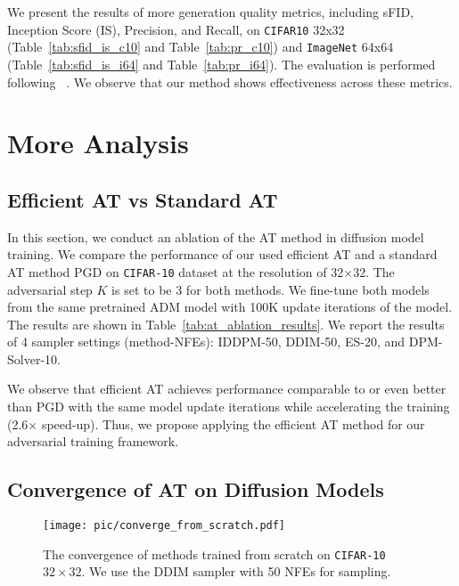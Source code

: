We present the results of more generation quality metrics, including sFID, Inception Score (IS), Precision, and Recall, on \texttt{CIFAR10} 32x32 (Table~\ref{tab:sfid_is_c10} and Table~\ref{tab:pr_c10}) and \texttt{ImageNet} 64x64 (Table~\ref{tab:sfid_is_i64} and Table~\ref{tab:pr_i64}). 
The evaluation is performed following ~\cite{dhariwal2021diffusion}. 
We observe that our method shows effectiveness across these metrics.



\section{More Analysis}
\subsection{Efficient AT vs Standard AT}\label{app:at_ablation}


In this section, we conduct an ablation of the AT method in diffusion model training.
We compare the performance of our used efficient AT and a standard AT method PGD on \texttt{CIFAR-10} dataset at the resolution of 32$\times$32.
The adversarial step $K$ is set to be 3 for both methods.
We fine-tune both models from the same pretrained ADM model with 100K update iterations of the model. 
The results are shown in Table~\ref{tab:at_ablation_results}.
We report the results of 4 sampler settings (method-NFEs): IDDPM-50, DDIM-50, ES-20, and DPM-Solver-10.


We observe that efficient AT achieves performance comparable to or even better than PGD with the same model update iterations while accelerating the training (2.6$\times$ speed-up). 
Thus, we propose applying the efficient AT method for our adversarial training framework.



\subsection{Convergence of AT on Diffusion Models}\label{app:convergence}

\begin{figure}[h]
    \centering
\texttt{[image: pic/converge\_from\_scratch.pdf]}
    \caption{The convergence of methods trained from scratch on \texttt{CIFAR-10} $32\times32$. We use the DDIM sampler with 50 NFEs for sampling.}\label{fig:convergence_from_scratch}
\end{figure}


